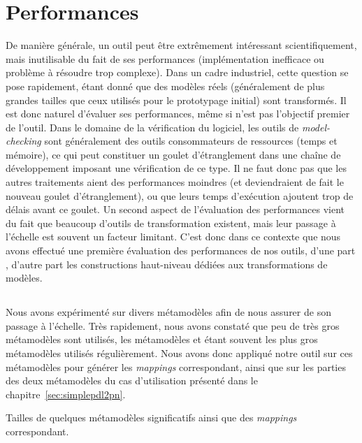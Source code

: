 \section{Performances}

De manière générale, un outil peut être extrêmement intéressant
scientifiquement, mais inutilisable du fait de ses performances (implémentation
inefficace ou problème à résoudre trop complexe). Dans un cadre industriel,
cette question se pose rapidement, étant donné que des modèles \og réels \fg
(généralement de plus grandes tailles que ceux utilisés pour le prototypage
initial) sont transformés. Il est donc naturel d'évaluer ses performances, même
si n'est pas l'objectif premier de l'outil. Dans le domaine de la vérification
du logiciel, les outils de \emph{model-checking} sont généralement des outils
consommateurs de ressources (temps et mémoire), ce qui peut constituer un
goulet d'étranglement dans une chaîne de développement imposant une
vérification de ce type. Il ne faut donc pas que les autres traitements aient
des performances moindres (et deviendraient de fait le nouveau goulet
d'étranglement), ou que leurs temps d'exécution ajoutent trop de délais avant
ce goulet. Un second aspect de l'évaluation des performances vient du fait que
beaucoup d'outils de transformation existent, mais leur passage à l'échelle est
souvent un facteur limitant. C'est donc dans ce contexte que nous avons
effectué une première évaluation des performances de nos outils, d'une part
{\tomemf}, d'autre part les constructions haut-niveau dédiées aux
transformations de modèles.

\subsection{{\tomemf}}

Nous avons expérimenté {\tomemf} sur divers métamodèles afin de nous assurer de
son passage à l'échelle. Très rapidement, nous avons constaté que peu de très
gros métamodèles sont utilisés, les métamodèles {\ecore} et {\uml} étant
souvent les plus gros métamodèles utilisés régulièrement. Nous avons donc
appliqué notre outil sur ces métamodèles pour générer les \emph{mappings}
correspondant, ainsi que sur les parties des deux métamodèles du cas
d'utilisation présenté dans le chapitre~\ref{sec:simplepdl2pn}.

\begin{table}[h]
  \begin{center}
    
    \caption{Tailles de quelques métamodèles significatifs ainsi que des
      \emph{mappings} {\tomemf} correspondant.}
    \label{table:statsTomEMF}
  \end{center}
\end{table}


